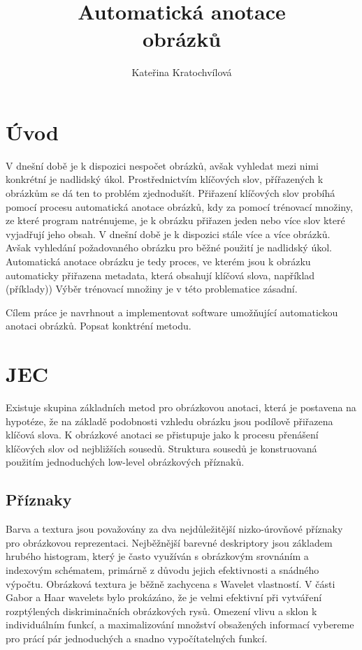 \documentclass[czech,BP]{thesiskiv}
\author{Kateřina Kratochvílová}
\title{Automatická anotace\\obrázků}
\begin{document}
%
\maketitle
\tableofcontents

\chapter{Úvod}
V dnešní době je k dispozici nespočet obrázků, avšak vyhledat mezi nimi konkrétní je nadlidský úkol. Prostřednictvím klíčových slov, přířazených k obrázkům se dá ten to problém zjednodušít. Přiřazení klíčových slov probíhá pomocí procesu automatická anotace obrázků, kdy za pomocí trénovací množiny, ze které program natrénujeme, je k obrázku přiřazen jeden nebo více slov které vyjadřují jeho obsah. V dnešní době je k dispozici stále více a více obrázků. Avšak vyhledání požadovaného obrázku pro běžné použití je nadlidský úkol. Automatická anotace obrázku je tedy proces, ve kterém jsou k obrázku automaticky přiřazena metadata, která obsahují klíčová slova, například (příklady)) Výběr trénovací množiny je v této problematice zásadní. 

Cílem práce je navrhnout a implementovat software umožňující automatickou anotaci obrázků. Popsat konktréní metodu.

 
% 
%

{\raggedright\small

}

\chapter{JEC}
Existuje skupina základních metod pro obrázkovou anotaci, která je postavena na hypotéze, že na základě podobnosti vzhledu obrázku jsou podílově přiřazena klíčová slova. K obrázkové anotaci se přistupuje jako k procesu přenášení klíčových slov od nejbližších sousedů. Struktura sousedů je konstruovaná použitím jednoduchých low-level obrázkových příznaků.
\section{Příznaky}
Barva a textura jsou považovány za dva nejdůležitější nizko-úrovňové příznaky pro obrázkovou reprezentaci. Nejběžnější barevné deskriptory jsou základem hrubého histogram, který je často využíván s obrázkovým srovnáním a indexovým schématem, primárně z důvodu jejich efektivnosti a snádného výpočtu. Obrázková textura je běžně zachycena s Wavelet vlastností. V části Gabor a Haar wavelets bylo prokázáno, že je velmi efektivní při vytváření rozptýlených diskriminačních obrázkových rysů. Omezení vlivu a sklon k individuálním funkcí, a maximalizování množství obsažených informací vybereme pro prácí pár jednoduchých a snadno vypočítatelných funkcí. 
\end{document}
